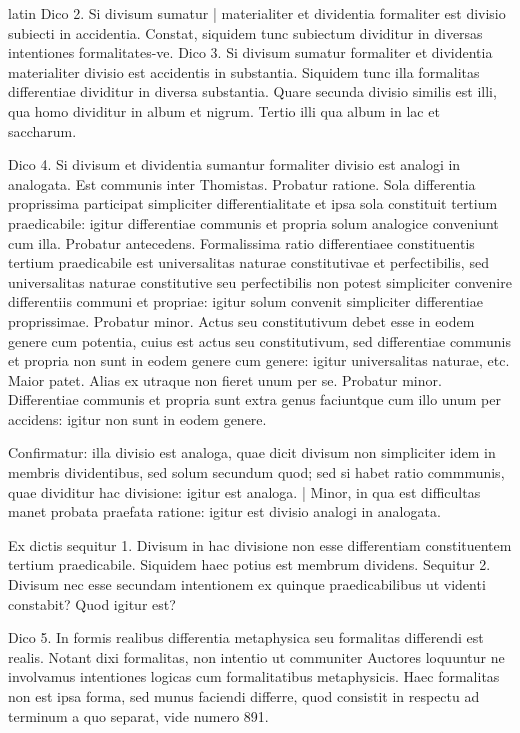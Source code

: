 \begin{otherlanguage*}{latin}
\pstart
 Dico 2. Si divisum sumatur \textnormal{|}   materialiter et dividentia formaliter est divisio subiecti in accidentia. Constat, siquidem tunc subiectum dividitur in diversas intentiones formalitates-ve. Dico 3. Si divisum sumatur formaliter et dividentia materialiter divisio est accidentis in substantia. Siquidem tunc illa formalitas differentiae dividitur in diversa substantia. Quare secunda divisio similis est illi, qua  homo dividitur in album et nigrum. Tertio illi qua album in lac et saccharum. 
\pend

\pstart
 Dico 4. Si divisum et dividentia sumantur formaliter divisio est analogi in analogata. Est communis inter Thomistas. Probatur ratione. Sola differentia proprissima participat simpliciter differentialitate et ipsa sola constituit tertium praedicabile: igitur differentiae communis et propria solum analogice conveniunt cum illa. Probatur antecedens. Formalissima ratio differentiaee constituentis tertium praedicabile est universalitas naturae constitutivae et perfectibilis, sed universalitas naturae constitutive seu perfectibilis non potest simpliciter convenire differentiis communi et propriae: igitur solum convenit simpliciter differentiae proprissimae. Probatur minor. Actus seu constitutivum debet esse in eodem genere cum potentia, cuius est actus seu constitutivum, sed differentiae communis et propria non sunt in eodem genere cum genere: igitur universalitas naturae, etc. Maior patet. Alias ex utraque non fieret unum per se. Probatur minor. Differentiae communis et propria sunt extra genus faciuntque cum illo unum per accidens: igitur non sunt in eodem genere. 
\pend

\pstart
 Confirmatur: illa divisio est analoga, quae dicit divisum non simpliciter idem in membris dividentibus, sed solum secundum quod; sed si habet ratio commmunis, quae dividitur hac divisione: igitur est analoga. \textnormal{|} Minor, in qua est difficultas manet probata praefata ratione: igitur est divisio analogi in analogata. 
\pend

\pstart
 Ex dictis sequitur 1. Divisum in hac divisione non esse differentiam constituentem tertium praedicabile. Siquidem haec potius est membrum dividens. Sequitur 2. Divisum nec esse secundam intentionem ex quinque praedicabilibus ut videnti constabit? Quod igitur est? 
\pend

\pstart
 Dico 5. In formis realibus differentia metaphysica seu formalitas differendi est realis. Notant dixi formalitas, non intentio ut communiter Auctores loquuntur ne involvamus intentiones logicas cum formalitatibus metaphysicis. Haec formalitas non est ipsa forma, sed munus faciendi differre, quod consistit in respectu ad terminum a quo separat, vide numero 891. 
\pend


\end{otherlanguage*}
